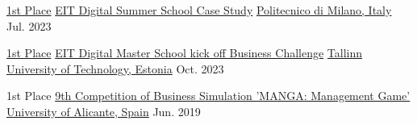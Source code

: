



\begin{cvhonors}

  \cvhonor
    {\href{http://bit.ly/3u6Lm2b}{1st Place}} %
    {\href{https://www.instagram.com/p/Cu9dOXZswlK/?img_index=9}{EIT Digital Summer School Case Study}} %
    {\href{https://www.polimi.it/}{Politecnico di Milano, Italy}} %
    {Jul. 2023} %
    
  \cvhonor
	{\href{https://bit.ly/4aH8i7z}{1st Place}} %
	{\href{https://www.eitdigital.eu/newsroom/news/2022/eit-digital-master-school-kicks-off-academic-year-2022/}{EIT Digital Master School kick off Business Challenge}} %
	{\href{https://taltech.ee/en/}{Tallinn University of Technology, Estonia}} %
	{Oct. 2023} %

  \cvhonor
	{1st Place} %
	{\href{https://economicas.ua.es/es/actividades-y-eventos/juego-de-simulacion/ediciones-anteriores/juego-de-simulacion-empresarial-2018-19.html}{9th Competition of Business Simulation 'MANGA: Management Game'}} %
	{\href{https://www.ua.es/en/}{University of Alicante, Spain}} %
	{Jun. 2019} %

\end{cvhonors}


